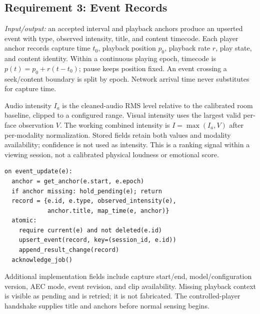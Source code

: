 \subsection{Requirement 3: Event Records}
\textit{Input/output:} an accepted interval and playback anchors produce an upserted event with type, observed intensity, title, and content timecode. Each player anchor records capture time $t_0$, playback position $p_0$, playback rate $r$, play state, and content identity. Within a continuous playing epoch, timecode is $p(t)=p_0+r(t-t_0)$; pause keeps position fixed. An event crossing a seek/content boundary is split by epoch. Network arrival time never substitutes for capture time.

Audio intensity $I_a$ is the cleaned-audio RMS level relative to the calibrated room baseline, clipped to a configured range. Visual intensity uses the largest valid per-face observation $V$. The working combined intensity is $I=\max(I_a,V)$ after per-modality normalization. Stored fields retain both values and modality availability; confidence is not used as intensity. This is a ranking signal within a viewing session, not a calibrated physical loudness or emotional score.
\par\smallskip\noindent\begin{minipage}{\columnwidth}
\begin{lstlisting}
on event_update(e):
  anchor = get_anchor(e.start, e.epoch)
  if anchor missing: hold_pending(e); return
  record = {e.id, e.type, observed_intensity(e),
            anchor.title, map_time(e, anchor)}
  atomic:
    require current(e) and not deleted(e.id)
    upsert_event(record, key=(session_id, e.id))
    append_result_change(record)
  acknowledge_job()
\end{lstlisting}
\end{minipage}\par
Additional implementation fields include capture start/end, model/configuration version, AEC mode, event revision, and clip availability. Missing playback context is visible as pending and is retried; it is not fabricated. The controlled-player handshake supplies title and anchors before normal sensing begins.

